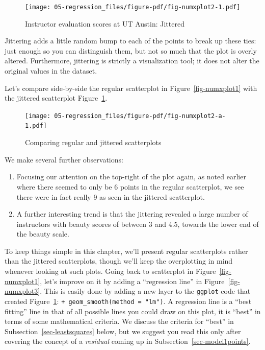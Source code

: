 \documentclass[
  letterpaper,
  DIV=11,
  numbers=noendperiod]{scrreprt}
\theoremstyle{definition}
\theoremstyle{remark}
\begin{document}
\begin{figure}

{\centering \texttt{[image: 05-regression\_files/figure-pdf/fig-numxplot2-1.pdf]}

}

\caption{\label{fig-numxplot2}Instructor evaluation scores at UT Austin:
Jittered}

\end{figure}

Jittering adds a little random bump to each of the points to break up
these ties: just enough so you can distinguish them, but not so much
that the plot is overly altered. Furthermore, jittering is strictly a
visualization tool; it does not alter the original values in the
dataset.

Let's compare side-by-side the regular scatterplot in
Figure~\ref{fig-numxplot1} with the jittered scatterplot
Figure~\ref{fig-numxplot2}.

\begin{figure}

{\centering \texttt{[image: 05-regression\_files/figure-pdf/fig-numxplot2-a-1.pdf]}

}

\caption{\label{fig-numxplot2-a}Comparing regular and jittered
scatterplots}

\end{figure}

We make several further observations:

\begin{enumerate}
\def\labelenumi{\arabic{enumi}.}
\item
  Focusing our attention on the top-right of the plot again, as noted
  earlier where there seemed to only be 6 points in the regular
  scatterplot, we see there were in fact really 9 as seen in the
  jittered scatterplot.
\item
  A further interesting trend is that the jittering revealed a large
  number of instructors with beauty scores of between 3 and 4.5, towards
  the lower end of the beauty scale.
\end{enumerate}

To keep things simple in this chapter, we'll present regular
scatterplots rather than the jittered scatterplots, though we'll keep
the overplotting in mind whenever looking at such plots. Going back to
scatterplot in Figure~\ref{fig-numxplot1}, let's improve on it by adding
a ``regression line'' in Figure~\ref{fig-numxplot3}. This is easily done
by adding a new layer to the \texttt{ggplot} code that created
Figure~\ref{fig-numxplot2}: \texttt{+\ geom\_smooth(method\ =\ "lm")}. A
regression line is a ``best fitting'' line in that of all possible lines
you could draw on this plot, it is ``best'' in terms of some
mathematical criteria. We discuss the criteria for ``best'' in
Subsection~\ref{sec-leastsquares} below, but we suggest you read this
only after covering the concept of a \emph{residual} coming up in
Subsection~\ref{sec-model1points}.
\end{document}
